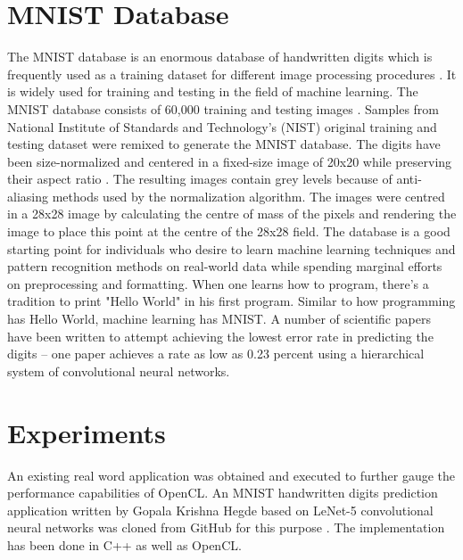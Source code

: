 \section{MNIST Database}
\label{sect5_2}
The \ac{MNIST} database is an enormous database of handwritten digits which is frequently used as a training dataset for different image processing procedures \cite{mnist_wiki}. It is widely used for training and testing in the field of machine learning. \newline\newline 
The MNIST database consists of 60,000 training and testing images \cite{mnist_kus_ernst}. Samples from National Institute of Standards and Technology’s (NIST) original training and testing dataset were remixed to generate the MNIST database. The digits have been size-normalized and centered in a fixed-size image of 20x20 while preserving their aspect ratio \cite{cnn_lecun_mnist_app}. The resulting images contain grey levels because of anti-aliasing methods used by the normalization algorithm. The images were centred in a 28x28 image by calculating the centre of mass of the pixels and rendering the image to place this point at the centre of the 28x28 field. \newline\newline
The database is a good starting point for individuals who desire to learn machine learning techniques and pattern recognition methods on real-world data while spending marginal efforts on preprocessing and formatting. When one learns how to program, there's a tradition to print "Hello World" in his first program. Similar to how programming has Hello World, machine learning has MNIST. \newline\newline
A number of scientific papers have been written to attempt achieving the lowest error rate in predicting the digits – one paper achieves a rate as low as 0.23 percent using a hierarchical system of convolutional neural networks.

\section{Experiments}
\label{sect5_3}
An existing real word application was obtained and executed to further gauge the performance capabilities of OpenCL. An MNIST handwritten digits prediction application written by Gopala Krishna Hegde based on LeNet-5 convolutional neural networks was cloned from GitHub for this purpose \cite{cnn_mnist_papaa}. The implementation has been done in C++ as well as OpenCL.

